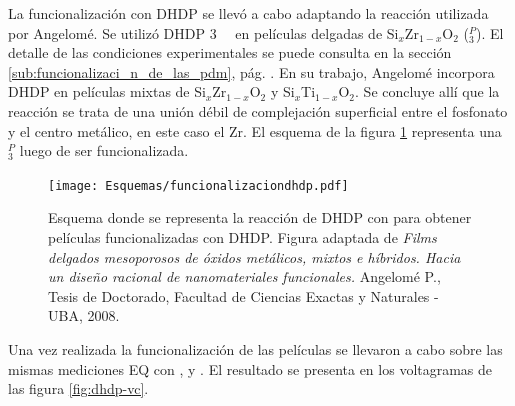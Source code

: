 			La funcionalización con DHDP se llevó a cabo adaptando la reacción utilizada por Angelomé\cite{Angelome2008}. Se utilizó DHDP \SI{3}{\milli\Molar} en películas delgadas de Si$_x$Zr$_{1-x}$O$_2$ (\pdmZ$^P_3$). El detalle de las condiciones experimentales se puede consulta en la sección \ref{sub:funcionalizaci_n_de_las_pdm}, pág. \pageref{sub:funcionalizaci_n_de_las_pdm}. En su trabajo, Angelomé incorpora DHDP en películas mixtas de Si$_x$Zr$_{1-x}$O$_2$ y Si$_x$Ti$_{1-x}$O$_2$. Se concluye allí que la reacción se trata de una unión débil de complejación superficial entre el fosfonato y el centro metálico, en este caso el Zr. El esquema de la figura \ref{esq:dhdp-esquema} representa una \pdmZ$^P_3$ luego de ser funcionalizada.

				 \begin{figure}[ht!]	
					\centering
			 	    \texttt{[image: Esquemas/funcionalizaciondhdp.pdf]}
			        \caption[Funcionalización con DHDP 3mM]{Esquema donde se representa la reacción de DHDP con \pdmZ\space para obtener películas funcionalizadas con DHDP. Figura adaptada de \textit{Films delgados mesoporosos de óxidos metálicos, mixtos e híbridos. Hacia un diseño racional de nanomateriales funcionales.} Angelomé P., Tesis de Doctorado, Facultad de Ciencias Exactas y Naturales - UBA, 2008.\cite{Angelome2008}}
			        \label{esq:dhdp-esquema}
			      	\end{figure}

			\pagebreak

			Una vez realizada la funcionalización de las películas se llevaron a cabo sobre las mismas mediciones EQ con \fe, \fc\space y \ru. El resultado se presenta en los voltagramas de las figura \ref{fig:dhdp-vc}. 

